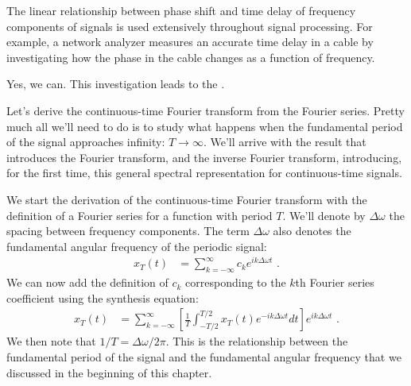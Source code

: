 The linear relationship between phase shift and time delay of
frequency components of signals is used extensively throughout signal
processing. For example, a network analyzer measures an accurate time
delay in a cable by investigating how the phase in the cable changes
as a function of frequency.

Yes, we can. This investigation leads to the \emph{}.

Let's derive the continuous-time Fourier transform from the Fourier series. Pretty much all we'll need to do is
to study what happens when the fundamental period of the signal approaches infinity: $T\rightarrow \infty$.
We'll arrive with the result that introduces the Fourier transform, and the inverse Fourier transform, 
introducing, for the first time, this general spectral representation for continuous-time signals.

We start the derivation of the continuous-time Fourier transform with the definition of a Fourier series for a
function with period $T$. We'll denote by $\Delta \omega$ the spacing between frequency components.
The term $\Delta \omega$ also denotes the fundamental angular frequency of the periodic signal:
\begin{align}
  x_{T}(t) & = \sum_{k=-\infty}^{\infty} c_k e^{ik\Delta \omega t}  \,\,.
\end{align}
We can now add the definition of $c_k$ corresponding to the $k$th Fourier series coefficient using the synthesis equation:
\begin{align}
  x_{T}(t) & = \sum_{k=-\infty}^{\infty} \left[\frac{1}{T}\int_{-T/2}^{T/2} x_{T}(t) e^{-ik\Delta \omega t} dt\right]  e^{ik\Delta \omega t}  \,\,.
\end{align}
We then note that $1/T = \Delta \omega/2\pi$. This is the relationship between the fundamental period of
the signal and the fundamental angular frequency that we discussed in the beginning of this chapter.

